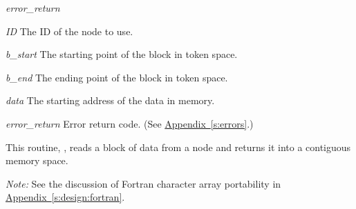 \begin{Ventryi}{\textit{error\_return}}
\item[\textit{ID}]
     The ID of the node to use.
\item[\textit{b\_start}]
     The starting point of the block in token space.
\item[\textit{b\_end}]
     The ending point of the block in token space.
\item[\textit{data}]
     The starting address of the data in memory.
\item[\textit{error\_return}]
     Error return code.
     (See \hyperref[s:errors]{Appendix~\ref*{s:errors}}.)
\end{Ventryi}

This routine, , reads a block of data from a
node and returns it into a contiguous memory space.

\noindent
\emph{Note:}
See the discussion of Fortran character array portability in
\hyperref[s:design:fortran]{Appendix~\ref*{s:design:fortran}}.

\label{sub:Write_Data}

